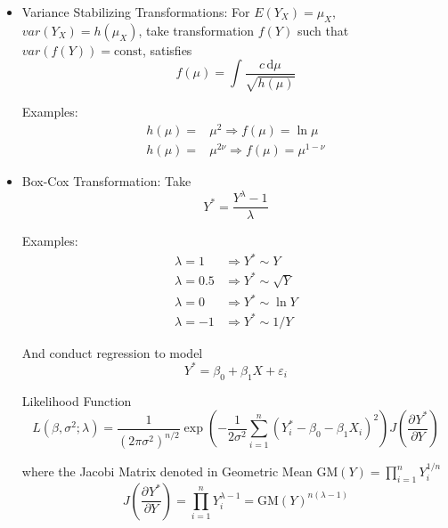         \begin{itemize}[topsep=2pt,itemsep=2pt]
            \item Variance Stabilizing Transformations:
                For $ E(Y_X)=\mu_X$, $ var(Y_X)=h(\mu_X) $, take transformation $ f(Y) $ such that $ var(f(Y))=\mathrm{const} $, satisfies
                \begin{equation}
                    f(\mu)=\int\dfrac{c\,\mathrm{d}\mu}{\sqrt{h(\mu)}} 
                \end{equation}
    
                Examples:
                \begin{align*}
                    h(\mu)=&\mu^2\Rightarrow f(\mu )=\ln\mu\\
                    h(\mu)=&\mu^{2\nu}\Rightarrow f(\mu )=\mu ^{1-\nu}
                \end{align*}
            
            \item Box-Cox Transformation: Take 
        \begin{equation}
            Y^*=\dfrac{Y^\lambda -1}{\lambda }
        \end{equation}
    
                Examples:
            \begin{align*}
                \lambda =1&\Rightarrow Y^*\sim Y\\
                \lambda =0.5&\Rightarrow Y^*\sim \sqrt{Y}\\
                \lambda =0&\Rightarrow Y^*\sim \ln Y\\
                \lambda =-1&\Rightarrow Y^*\sim 1/Y
            \end{align*}
        
            And conduct regression to model
            \begin{equation}
                Y^* =\beta _0+\beta _1X+\varepsilon_i 
            \end{equation}
            
            Likelihood Function
            \begin{equation}
                L(\beta ,\sigma ^2;\lambda )=\dfrac{1}{(2\pi\sigma ^2)^{n/2}}\exp\left( -\dfrac{1}{2\sigma ^2}\sum_{i=1}^n (Y_i^*-\beta _0-\beta _1X_i)^2 \right) J(\dfrac{\partial^{} Y^*}{\partial Y^{}})
            \end{equation}
    
            where the Jacobi Matrix denoted in Geometric Mean $ \mathrm{GM}(Y)=\prod_{i=1}^n Y_i^{1/n}$
            \begin{equation}
                J(\dfrac{\partial^{} Y^*}{\partial Y^{}})=\prod_{i=1}^nY_i^{\lambda -1}=\mathrm{GM}(Y)^{n(\lambda -1)}
            \end{equation}
            

\end{itemize}

